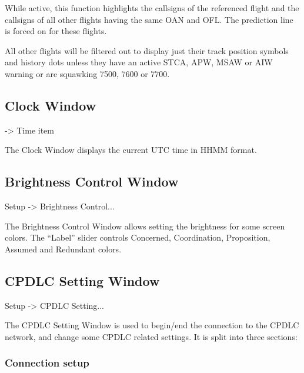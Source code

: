 \documentclass[a4paper,oneside,11pt]{memoir}
\begin{document}
\bigskip

While active, this function highlights the callsigns of the referenced flight and the callsigns of all other flights having the same OAN and OFL. The prediction line is forced on for these flights.

\bigskip

All other flights will be filtered out to display just their track position symbols and history dots unless they have an active STCA, APW, MSAW or AIW warning or are squawking 7500, 7600 or 7700.

\subsection{Clock Window}\label{win:clock}

 -> Time item


The Clock Window displays the current UTC time in HHMM format.

\subsection{Brightness Control Window}
\label{win:bcw}

 Setup -> Brightness Control...

\bigskip


The Brightness Control Window allows setting the brightness for some screen colors. The “Label” slider controls Concerned, Coordination, Proposition, Assumed and Redundant colors.

\subsection{CPDLC Setting Window}
\label{win:dls}

 Setup -> CPDLC Setting...


The CPDLC Setting Window is used to begin/end the connection to the CPDLC network, and change some CPDLC related settings. It is split into three sections:

\subsubsection*{Connection setup}
\end{document}
